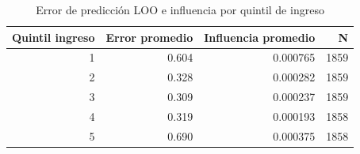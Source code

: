 \begin{table}[ht]
\centering
\begin{tabular}{rrrr}
  \toprule
Quintil ingreso & Error promedio & Influencia promedio & N \\ 
  \midrule
1 & 0.604 & 0.000765 & 1859 \\ 
  2 & 0.328 & 0.000282 & 1859 \\ 
  3 & 0.309 & 0.000237 & 1859 \\ 
  4 & 0.319 & 0.000193 & 1858 \\ 
  5 & 0.690 & 0.000375 & 1858 \\ 
   \bottomrule
\end{tabular}
\caption{Error de predicción LOO e influencia por quintil de ingreso} 
\label{tab:quintil}
\end{table}
